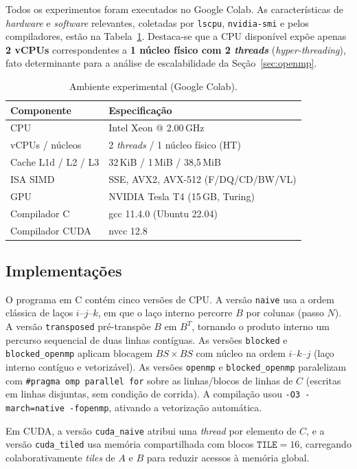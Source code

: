 \documentclass{sbc2023}%
\begin{document}
Todos os experimentos foram executados no Google Colab. As características de \textit{hardware} e \textit{software} relevantes, coletadas por \texttt{lscpu}, \texttt{nvidia-smi} e pelos compiladores, estão na Tabela~\ref{tab:ambiente}. Destaca-se que a CPU disponível expõe apenas \textbf{2 vCPUs} correspondentes a \textbf{1 núcleo físico com 2 \textit{threads}} (\textit{hyper-threading}), fato determinante para a análise de escalabilidade da Seção~\ref{sec:openmp}.

\begin{table}[!ht]
\caption{Ambiente experimental (Google Colab).}
\centering
\begin{tabular}{@{}ll@{}}
\hline\hline
Componente & Especificação \\
\hline
CPU & Intel Xeon @ 2.00\,GHz \\
vCPUs / núcleos & 2 \textit{threads} / 1 núcleo físico (HT) \\
Cache L1d / L2 / L3 & 32\,KiB / 1\,MiB / 38{,}5\,MiB \\
ISA SIMD & SSE, AVX2, AVX-512 (F/DQ/CD/BW/VL) \\
GPU & NVIDIA Tesla T4 (15\,GB, Turing) \\
Compilador C & gcc 11.4.0 (Ubuntu 22.04) \\
Compilador CUDA & nvcc 12.8 \\
\hline\hline
\end{tabular}
\label{tab:ambiente}
\end{table}

\subsection{Implementações}

O programa em C contém cinco versões de CPU. A versão \texttt{naive} usa a ordem clássica de laços $i$--$j$--$k$, em que o laço interno percorre $B$ por colunas (passo $N$). A versão \texttt{transposed} pré-transpõe $B$ em $B^{T}$, tornando o produto interno um percurso sequencial de duas linhas contíguas. As versões \texttt{blocked} e \texttt{blocked\_openmp} aplicam blocagem $BS \times BS$ com núcleo na ordem $i$--$k$--$j$ (laço interno contíguo e vetorizável). As versões \texttt{openmp} e \texttt{blocked\_openmp} paralelizam com \texttt{\#pragma omp parallel for} sobre as linhas/blocos de linhas de $C$ (escritas em linhas disjuntas, sem condição de corrida). A compilação usou \texttt{-O3 -march=native -fopenmp}, ativando a vetorização automática.

Em CUDA, a versão \texttt{cuda\_naive} atribui uma \textit{thread} por elemento de $C$, e a versão \texttt{cuda\_tiled} usa memória compartilhada com blocos $\texttt{TILE}=16$, carregando colaborativamente \textit{tiles} de $A$ e $B$ para reduzir acessos à memória global.
\end{document}

